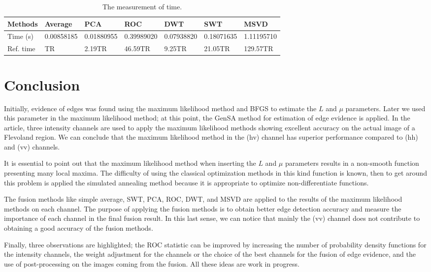 \documentclass[conference]{IEEEtran}
\begin{document}
\begin{table}[hbt]
	\centering
	\tiny
	\caption{The measurement of time.}\label{metrica_de_tempo}
\begin{tabular}{@{}lllllll@{}} \toprule
	Methods       & Average    &   PCA      &  ROC      & DWT       &  SWT        &  MSVD \\ \midrule
	Time (s)      & 0.00858185 & 0.01880955 &0.39989020 &0.07938820 &  0.18071635 & 1.11195710  \\
    Ref. time     & TR & 2.19TR &46.59TR & 9.25TR   & 21.05TR & 129.57TR  \\ \bottomrule
\end{tabular}
\end{table}


\section{Conclusion}\label{sec_05}

Initially, evidence of edges was found using the maximum likelihood method and BFGS to estimate the $L$ and $\mu$ parameters. Later we used this parameter in the maximum likelihood method; at this point, the GenSA method for estimation of edge evidence is applied. In the article, three intensity channels are used to apply the maximum likelihood methods showing excellent accuracy on the actual image of a Flevoland region. We can conclude that the maximum likelihood method in the (hv) channel has superior performance compared to (hh) and (vv) channels.

It is essential to point out that the maximum likelihood method when inserting the $L$ and $\mu$ parameters results in a non-smooth function presenting many local maxima. The difficulty of using the classical optimization methods in this kind function is known, then to get around this problem is applied the simulated annealing method because it is appropriate to optimize non-differentiate functions.

The fusion methods like simple average, SWT, PCA, ROC, DWT, and MSVD are applied to the results of the maximum likelihood methods on each channel. The purpose of applying the fusion methods is to obtain better edge detection accuracy and measure the importance of each channel in the final fusion result.  In this last sense, we can notice that mainly the (vv) channel does not contribute to obtaining a good accuracy of the fusion methods.

Finally, three observations are highlighted; the ROC statistic can be improved by increasing the number of probability density functions for the intensity channels, the weight adjustment for the channels or the choice of the best channels for the fusion of edge evidence, and the use of post-processing on the images coming from the fusion. All these ideas are work in progress.



\end{document}
